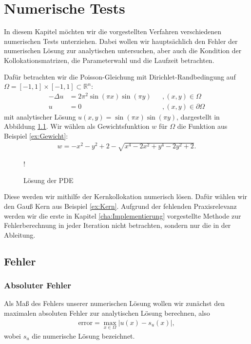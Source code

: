 \chapter{Numerische Tests}
\label{cha:NumerischeTests}

In diesem Kapitel möchten wir die vorgestellten Verfahren verschiedenen numerischen Tests unterziehen. Dabei wollen wir hauptsächlich den Fehler der numerischen Lösung zur analytischen untersuchen, aber auch die Kondition der Kollokationsmatrizen, die Parameterwahl und die Laufzeit betrachten.

Dafür betrachten wir die Poisson-Gleichung mit Dirichlet-Randbedingung auf $\Omega = [-1,1] \times [-1,1] \subset \mathbb{R}^n$:
\begin{align*}
- \Delta u &= 2\pi^2 \sin(\pi x)\sin(\pi y)&&, (x,y) \in \Omega\\
u &= 0&&, (x,y) \in \partial \Omega
\end{align*}
mit analytischer Lösung $u(x,y) = \sin(\pi x)\sin(\pi y)$, dargestellt in Abbildung \ref{fig:plot}. Wir wählen als Gewichtsfunktion $w$ für $\Omega$ die Funktion aus Beispiel \ref{ex:Gewicht}:
\begin{align*}
w = -x^2-y^2+2 - \sqrt{x^4 -2x^2 + y^4 -2y^2+2}.
\end{align*}
\begin{figure}[ht]
\centering
\resizebox {\columnwidth} {!} {

}
\caption{Lösung der \acs{PDE}}
\label{fig:plot}
\end{figure}

Diese werden wir mithilfe der Kernkollokation numerisch lösen. Dafür wählen wir den Gauß Kern aus Beispiel \ref{ex:Kern}. Aufgrund der fehlenden Praxisrelevanz werden wir die erste in Kapitel \ref{cha:Implementierung} vorgestellte Methode zur Fehlerberechnung in jeder Iteration nicht betrachten, sondern nur die in der Ableitung.

\section{Fehler}
\subsection{Absoluter Fehler}

Als Maß des Fehlers unserer numerischen Lösung wollen wir zunächst den maximalen absoluten Fehler zur analytischen Lösung berechnen, also
\begin{align*}
\text{error} = \max_{x \in \Omega} |u(x) - s_u (x)|,
\end{align*}
wobei $s_u$ die numerische Lösung bezeichnet.

